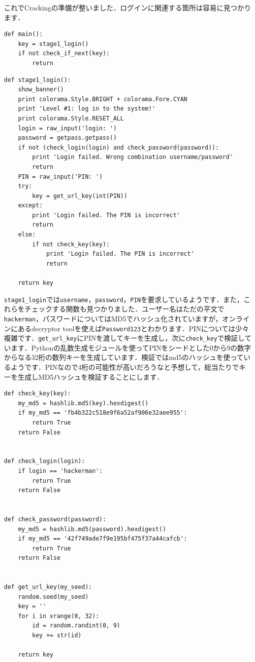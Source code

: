これでCrackingの準備が整いました．ログインに関連する箇所は容易に見つかります．
\begin{tcolorbox}[sharp corners, left=2mm]\scriptsize
\begin{verbatim}
def main():
    key = stage1_login()
    if not check_if_next(key):
        return
\end{verbatim}
\end{tcolorbox}
\begin{tcolorbox}[sharp corners, left=2mm]\scriptsize
\begin{verbatim}
def stage1_login():
    show_banner()
    print colorama.Style.BRIGHT + colorama.Fore.CYAN
    print 'Level #1: log in to the system!'
    print colorama.Style.RESET_ALL
    login = raw_input('login: ')
    password = getpass.getpass()
    if not (check_login(login) and check_password(password)):
        print 'Login failed. Wrong combination username/password'
        return
    PIN = raw_input('PIN: ')
    try:
        key = get_url_key(int(PIN))
    except:
        print 'Login failed. The PIN is incorrect'
        return
    else:
        if not check_key(key):
            print 'Login failed. The PIN is incorrect'
            return

    return key
\end{verbatim}
\end{tcolorbox}
\texttt{stage1\_login}では\texttt{username}，\texttt{password}，\texttt{PIN}を要求しているようです．また，これらをチェックする関数も見つかりました．ユーザー名はただの平文で\texttt{hackerman}，パスワードについてはMD5でハッシュ化されていますが，オンラインにあるdecryptor toolを使えば\texttt{Password123}とわかります．PINについては少々複雑です．\texttt{get\_url\_key}にPINを渡してキーを生成し，次に\texttt{check\_key}で検証しています．Pythonの乱数生成モジュールを使ってPINをシードとした0から9の数字からなる32桁の数列キーを生成しています．検証ではmd5のハッシュを使っているようです．PINなので4桁の可能性が高いだろうなと予想して，総当たりでキーを生成しMD5ハッシュを検証することにします．
\begin{tcolorbox}[sharp corners, left=2mm]\scriptsize
\begin{verbatim}
def check_key(key):
    my_md5 = hashlib.md5(key).hexdigest()
    if my_md5 == 'fb4b322c518e9f6a52af906e32aee955':
        return True
    return False


def check_login(login):
    if login == 'hackerman':
        return True
    return False


def check_password(password):
    my_md5 = hashlib.md5(password).hexdigest()
    if my_md5 == '42f749ade7f9e195bf475f37a44cafcb':
        return True
    return False


def get_url_key(my_seed):
    random.seed(my_seed)
    key = ''
    for i in xrange(0, 32):
        id = random.randint(0, 9)
        key += str(id)

    return key
\end{verbatim}
\end{tcolorbox}

